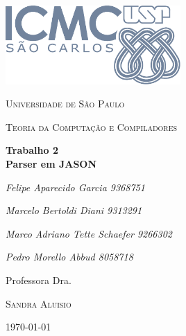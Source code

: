\begin{titlepage}
  \centering
  \includegraphics[width=0.5\textwidth]{./assets/icmcLogo.pdf}\par\vspace{1cm}
  {\scshape\LARGE Universidade de São Paulo \par}
  \vspace{1cm}
  {\scshape\Large  Teoria da Computação e Compiladores  \par}
  \vspace{1.5cm}
  {\huge\bfseries Trabalho 2 \\ Parser em JASON\par}
  \vspace{2cm}
  {\Large\itshape Felipe Aparecido Garcia 9368751\par}
  {\Large\itshape Marcelo Bertoldi Diani 9313291\par}
  {\Large\itshape Marco Adriano Tette Schaefer 9266302\par}
  {\Large\itshape Pedro Morello Abbud 8058718\par}

  \vfill
  Professora Dra.\par
  \textsc{Sandra Aluisio}

  \vfill

  {\large \today}
\end{titlepage}
